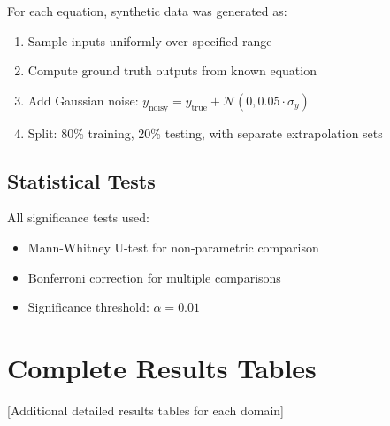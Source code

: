 \documentclass[twoside,11pt]{article}
\begin{document}
For each equation, synthetic data was generated as:
\begin{enumerate}
\item Sample inputs uniformly over specified range
\item Compute ground truth outputs from known equation
\item Add Gaussian noise: $y_{\text{noisy}} = y_{\text{true}} + \mathcal{N}(0, 0.05 \cdot \sigma_y)$
\item Split: 80\% training, 20\% testing, with separate extrapolation sets
\end{enumerate}

\subsection{Statistical Tests}

All significance tests used:
\begin{itemize}
\item Mann-Whitney U-test for non-parametric comparison
\item Bonferroni correction for multiple comparisons
\item Significance threshold: $\alpha = 0.01$
\end{itemize}

\section{Complete Results Tables}
\label{app:tables}

[Additional detailed results tables for each domain]
\end{document}
